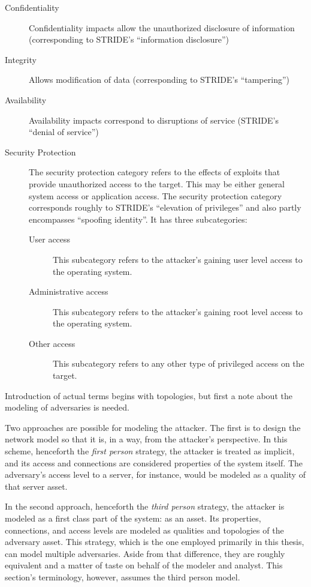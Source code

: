 \begin{description}
\item[Confidentiality] Confidentiality impacts allow the unauthorized disclosure 
    of information (corresponding to STRIDE's ``information disclosure'')
\item[Integrity] Allows modification of data (corresponding to STRIDE's ``tampering'')
\item[Availability] Availability impacts correspond to disruptions of service (STRIDE's
    ``denial of service'')
\item[Security Protection] The security protection category refers to the effects
    of exploits that provide unauthorized access to the target. This may be either
    general system access or application access. The security protection category
    corresponds roughly to STRIDE's ``elevation of privileges'' and also partly encompasses
    ``spoofing identity''. It has three subcategories:
    \begin{description}
    \item[User access] This subcategory refers to the attacker's gaining user level access
        to the operating system.
    \item[Administrative access] This subcategory refers to the attacker's gaining root level
        access to the operating system.
    \item[Other access] This subcategory refers to any other type of privileged access on
        the target.
    \end{description}
\end{description}
Introduction of actual terms begins with topologies, but first a note about the modeling
of adversaries is needed. 

Two approaches are possible for modeling the attacker. The first
is to design the network model so that it is, in a way, from the attacker's perspective.
In this scheme, henceforth the \emph{first person} strategy, the attacker is treated as
implicit, and its access and connections are considered properties of the system itself.
The adversary's access level to a server, for instance, would be modeled as a quality of
that server asset.

In the second approach, henceforth the \emph{third person} strategy, the attacker is
modeled as a first class part of the system: as an asset. Its properties, connections,
and access levels are modeled as qualities and topologies of the adversary asset.
This strategy, which is the one employed primarily in this thesis, can model multiple
adversaries. Aside from that difference, they are roughly equivalent and a matter
of taste on behalf of the modeler and analyst. This section's terminology, however,
assumes the third person model.

